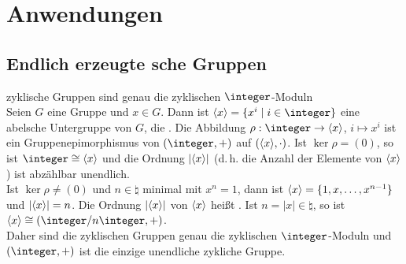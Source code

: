 \chapter{%
    Anwendungen%
}

\section{%
    Endlich erzeugte sche Gruppen%
}

\begin{Satz}{zyklische Gruppen sind genau die zyklischen $\integer$-Moduln} \\
    Seien $G$ eine Gruppe und $x \in G$.
    Dann ist $\aufspann{x} = \{x^i \;|\; i \in \integer\}$
    eine abelsche Untergruppe von $G$, die .
    Die Abbildung $\rho: \integer \rightarrow \aufspann{x}$, $i \mapsto x^i$
    ist ein Gruppenepimorphismus von $(\integer, +)$ auf
    $(\langle x \rangle, \cdot)$.
    Ist $\ker \rho = (0)$, so ist $\integer \cong \aufspann{x}$ und die Ordnung
    $|\langle x \rangle|$ (d.\,h. die Anzahl der Elemente von $\langle x \rangle$) ist
    abzählbar unendlich. \\
    Ist $\ker \rho \not= (0)$ und $n \in \natural$ minimal mit $x^n = 1$, dann
    ist $\langle x \rangle = \{1, x, \dotsc, x^{n-1}\}$ und $|\langle x \rangle| = n$.
    Die Ordnung $|\langle x \rangle|$ von $\langle x \rangle$ heißt
    .
    Ist $n = |x| \in \natural$, so ist
    $\aufspann{x} \cong (\integer/n\integer, +)$. \\
    Daher sind die zyklischen Gruppen genau die zyklischen $\integer$-Moduln
    und $(\integer, +)$ ist die einzige unendliche zykliche Gruppe.
\end{Satz}

